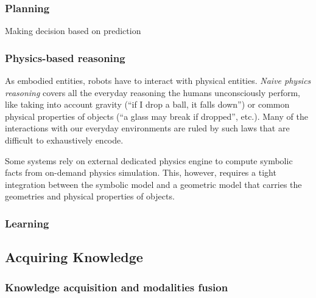 \subsubsection{Planning}
\label{sect|planning}

Making decision based on prediction

\subsubsection{Physics-based reasoning}
\label{sect|physics}

As embodied entities, robots have to interact with physical entities.
\emph{Naive physics reasoning} covers all the everyday reasoning the humans
unconsciously perform, like taking into account gravity (``if I drop a ball, it
falls down'') or common physical properties of objects (``a glass may break if
dropped'', etc.). Many of the interactions with our everyday environments are
ruled by such laws that are difficult to exhaustively encode.

Some systems \cite{Kunze2011a} rely on external dedicated physics engine to
compute symbolic facts from on-demand physics simulation. This, however,
requires a tight integration between the symbolic model and a geometric model
that carries the geometries and physical properties of objects.

\subsubsection{Learning}
\label{sect|learning}

\subsection{Acquiring Knowledge}

\begin{scriptsize}
\begin{center}
\end{center}
\end{scriptsize}

\subsubsection{Knowledge acquisition and modalities fusion}
\label{sect|knowledge-acquisition}

